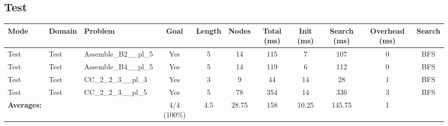 \documentclass{article}
\begin{document}
\subsection*{Test}
\begin{tabular}{lllcccccccc}
\toprule
Mode & Domain & Problem & Goal & Length & Nodes & Total (ms) & Init (ms) & Search (ms) & Overhead (ms) & Search \\
\midrule
Test & Test & Assemble\_B2\_\_pl\_5 & Yes & 5 & 14 & 115 & 7 & 107 & 0 & BFS \\
Test & Test & Assemble\_B4\_\_pl\_5 & Yes & 5 & 14 & 119 & 6 & 112 & 0 & BFS \\
Test & Test & CC\_2\_2\_3\_\_pl\_3 & Yes & 3 & 9 & 44 & 14 & 28 & 1 & BFS \\
Test & Test & CC\_2\_2\_3\_\_pl\_5 & Yes & 5 & 78 & 354 & 14 & 336 & 3 & BFS \\
\textbf{Averages:} & & & 4/4 (100\%) & 4.5 & 28.75 & 158 & 10.25 & 145.75 & 1 & \\
\bottomrule
\end{tabular}
\newpage
\end{document}
